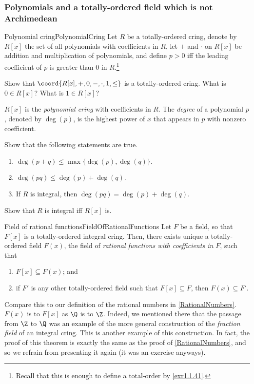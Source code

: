 \subsubsection{Polynomials and a totally-ordered field which is not Archimedean}

\begin{dfn}{Polynomial cring}{PolynomialCring}
Let $R$ be a totally-ordered cring, denote by $R[x]$ the set of all polynomials with coefficients in $R$, let $+$ and $\cdot$ on $R[x]$ be addition and multiplication of polynomials, and define $p>0$ iff the leading coefficient of $p$ is greater than $0$ in $R$.\footnote{Recall that this is enough to define a total-order by \cref{exr1.1.41}.} 
\begin{exr}[breakable=false]{}{}
Show that $\coord{R[x],+,0,-,\cdot ,1,\leq}$ is a totally-ordered cring.  What is $0\in R[x]$?  What is $1\in R[x]$?
\end{exr}
\noindent
$R[x]$ is the \emph{polynomial cring} with coefficients in $R$.  The \emph{degree} of a polynomial $p$, denoted by $\deg (p)$, is the highest power of $x$ that appears in $p$ with nonzero coefficient.
\end{dfn}
\begin{exr}{}{}
Show that the following statements are true.
\begin{enumerate}
\item $\deg (p+q)\leq \max \{ \deg (p),\deg (q)\}$.
\item $\deg (pq)\leq \deg (p)+\deg (q)$.
\item If $R$ is integral, then $\deg (pq)=\deg (p)+\deg (q)$.
\end{enumerate}
\end{exr}
\begin{exr}{}{}
Show that $R$ is integral iff $R[x]$ is.
\end{exr}
\begin{thm}{Field of rational functions}{FieldOfRationalFunctions}
Let $F$ be a field, so that $F[x]$ is a totally-ordered integral cring.  Then, there exists unique a totally-ordered field $F(x)$, the field of \emph{rational functions with coefficients in $F$}, such that
\begin{enumerate}
\item $F[x]\subseteq F(x)$; and
\item if $F'$ is any other totally-ordered field such that $F[x]\subseteq F
$, then $F(x)\subseteq F'$.
\end{enumerate}
\begin{rmk}
Compare this to our definition of the rational numbers in \cref{RationalNumbers}.  $F(x)$ is to $F[x]$ as $\Q$ is to $\Z$.  Indeed, we mentioned there that the passage from $\Z$ to $\Q$ was an example of the more general construction of the \emph{fraction field} of an integral cring.  This is another example of this construction.  In fact, the proof of this theorem is exactly the same as the proof of \cref{RationalNumbers}, and so we refrain from presenting it again (it was an exercise anyways).
\end{rmk}
\end{thm}
